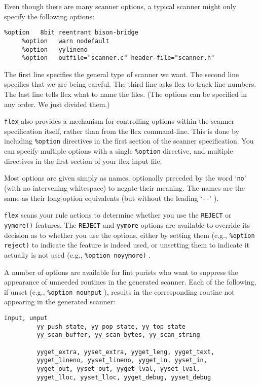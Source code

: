 \documentclass[openany,oneside]{book}
\begin{document}
Even though there are many scanner options, a typical scanner might only
specify the following options:
\begin{verbatim}
%option   8bit reentrant bison-bridge
     %option   warn nodefault
     %option   yylineno
     %option   outfile="scanner.c" header-file="scanner.h"
\end{verbatim}


The first line specifies the general type of scanner we want. The second line
specifies that we are being careful. The third line asks flex to track line
numbers. The last line tells flex what to name the files. (The options can be
specified in any order. We just divided them.)

 \verb`flex` also provides a mechanism for controlling options within the
scanner specification itself, rather than from the flex command-line. 
This is done by including \verb`%option` directives in the first section
of the scanner specification.  You can specify multiple options with a
single \verb`%option` directive, and multiple directives in the first
section of your flex input file.

Most options are given simply as names, optionally preceded by the
word ‘\verb`no`’ (with no intervening whitespace) to negate their meaning. 
The names are the same as their long-option equivalents (but without the
leading ‘\verb`--`’ ).

 \verb`flex` scans your rule actions to determine whether you use the \verb`REJECT` or \verb`yymore()` features.  The \verb`REJECT` and \verb`yymore` options are available to override its decision as to
whether you use the options, either by setting them (e.g., \verb`%option reject)` to indicate the feature is indeed used, or unsetting them to
indicate it actually is not used (e.g., \verb`%option noyymore)` .

A number of options are available for lint purists who want to suppress
the appearance of unneeded routines in the generated scanner.  Each of
the following, if unset (e.g., \verb`%option nounput` ), results in the
corresponding routine not appearing in the generated scanner:
\begin{verbatim}
input, unput
         yy_push_state, yy_pop_state, yy_top_state
         yy_scan_buffer, yy_scan_bytes, yy_scan_string
     
         yyget_extra, yyset_extra, yyget_leng, yyget_text,
         yyget_lineno, yyset_lineno, yyget_in, yyset_in,
         yyget_out, yyset_out, yyget_lval, yyset_lval,
         yyget_lloc, yyset_lloc, yyget_debug, yyset_debug
\end{verbatim}
\end{document}
